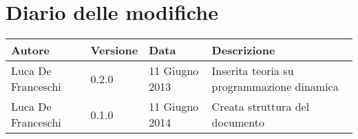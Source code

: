 \section*{Diario delle modifiche}

\begin{center}

	\begin{table}[htpd]
		\begin{tabular}{| l | l | l | p{50mm} |}
			\hline
			\hline
			\textbf{Autore} & \textbf{Versione} & \textbf{Data} & \textbf{Descrizione} \\
			\hline
			\hline
			Luca De Franceschi & 0.2.0 & 11 Giugno 2013 & Inserita teoria su programmazione dinamica \\ \hline
			Luca De Franceschi & 0.1.0 & 11 Giugno 2014 & Creata struttura del documento \\ \hline
		\end{tabular}
	\end{table}
	
\end{center}